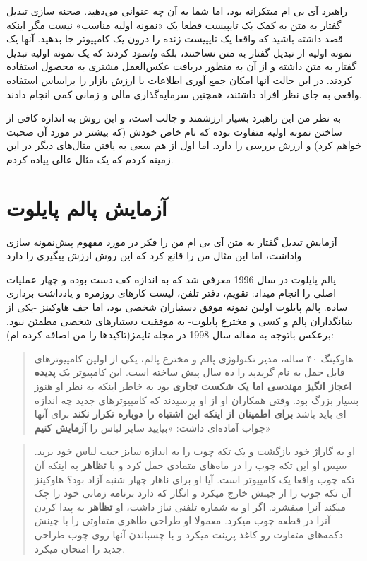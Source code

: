 راهبرد آی بی ام مبتکرانه بود، اما شما به آن چه عنوانی می‌دهید. صحنه سازی
تبدیل گفتار به متن به کمک یک تایپیست قطعا یک «نمونه اولیه مناسب» نیست
مگر اینکه قصد داشته باشید که واقعا یک تایپیست زنده را درون یک کامپیوتر
جا بدهید. آنها یک نمونه اولیه از تبدیل گفتار به متن نساختند، بلکه
\emph{وانمود} کردند که یک نمونه اولیه تبدیل گفتار به متن داشته و از آن
به منظور دریافت عکس‌العمل مشتری به محصول استفاده کردند. در این حالت آنها
امکان جمع آوری اطلاعات با ارزش بازار را براساس استفاده واقعی به جای نظر
افراد داشتند، همچنین سرمایه‌گذاری مالی و زمانی کمی انجام دادند.

به نظر من این راهبرد بسیار ارزشمند و جالب است، و این روش به اندازه کافی
از ساختن نمونه اولیه متفاوت بوده که نام خاص خودش (که بیشتر در مورد آن
صحبت خواهم کرد) و ارزش بررسی را دارد. اما اول از هم سعی به یافتن
مثال‌های دیگر در این زمینه کردم که یک مثال عالی پیاده کردم.

\section{آزمایش پالم
پایلوت}\label{ux622ux632ux645ux627ux6ccux634-ux67eux627ux644ux645-ux67eux627ux6ccux644ux648ux62a}

آزمایش تبدیل گفتار به متن آی بی ام من را فکر در مورد مفهوم پیش‌نمونه
سازی واداشت، اما این مثال من را قانع کرد که این روش ارزش پیگیری را دارد

پالم پایلوت در سال 1996 معرفی شد که به اندازه کف دست بوده و چهار عملیات
اصلی را انجام میداد: تقویم، دفتر تلفن، لیست کارهای روزمره و یادداشت
برداری ساده. پالم پایلوت اولین نمونه موفق دستیاران شخصی بود، اما جف
هاوکینز -یکی از بنیانگذاران پالم و کسی و مخترع پایلوت- به موفقیت
دستیارهای شخصی مطمئن نبود. برعکس باتوجه به مقاله سال 1998 در مجله
تایمز(تاکیدها را من اضافه کرده ام):

\begin{quote}
هاوکینگ ۴۰ ساله، مدیر تکنولوژی پالم و مخترع پالم، یکی از اولین
کامپیوترهای قابل حمل به نام گریدپد را ده سال پیش ساخته است. این کامپیوتر
یک \textbf{پدیده اعجاز انگیز مهندسی اما یک شکست تجاری} بود به خاطر اینکه
به نظر او هنوز بسیار بزرگ بود. وقتی همکاران او از او پرسیدند که
کامپیوترهای جدید چه اندازه ای باید باشد \textbf{برای اطمینان از اینکه
این اشتباه را دوباره تکرار نکند} برای آنها جواب آماده‌ای داشت: «بیایید
سایز لباس را \textbf{آزمایش کنیم}»
\end{quote}

\begin{quote}
او به گاراژ خود بازگشت و یک تکه چوب را به اندازه سایز جیب لباس خود برید.
سپس او این تکه چوب را در ماه‌های متمادی حمل کرد و با \textbf{تظاهر} به
اینکه آن تکه چوب واقعا یک کامپیوتر است. آیا او برای ناهار چهار شنبه آزاد
بود؟ هاوکینز آن تکه چوب را از جیبش خارج میکرد و انگار که دارد برنامه
زمانی خود را چک میکند آنرا میفشرد. اگر او به شماره تلفنی نیاز داشت، او
\textbf{تظاهر} به پیدا کردن آنرا در قطعه چوب میکرد. معمولا او طراحی
ظاهری متفاوتی را با چینش دکمه‌های متفاوت رو کاغذ پرینت میکرد و با
چسباندن آنها روی چوب طراحی جدید را امتحان میکرد.
\end{quote}

